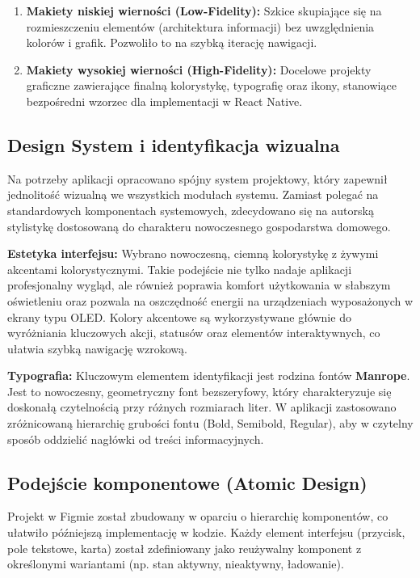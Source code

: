 \begin{enumerate}
    \item \textbf{Makiety niskiej wierności (Low-Fidelity):} Szkice skupiające się na rozmieszczeniu elementów (architektura informacji) bez uwzględnienia kolorów i grafik. Pozwoliło to na szybką iterację nawigacji.
    \item \textbf{Makiety wysokiej wierności (High-Fidelity):} Docelowe projekty graficzne zawierające finalną kolorystykę, typografię oraz ikony, stanowiące bezpośredni wzorzec dla implementacji w React Native.
\end{enumerate}

\subsection{Design System i identyfikacja wizualna}

Na potrzeby aplikacji opracowano spójny system projektowy, który zapewnił jednolitość wizualną we wszystkich modułach systemu. Zamiast polegać na standardowych komponentach systemowych, zdecydowano się na autorską stylistykę dostosowaną do charakteru nowoczesnego gospodarstwa domowego.

\textbf{Estetyka interfejsu:}
Wybrano nowoczesną, ciemną kolorystykę z żywymi akcentami kolorystycznymi. Takie podejście nie tylko nadaje aplikacji profesjonalny wygląd, ale również poprawia komfort użytkowania w słabszym oświetleniu oraz pozwala na oszczędność energii na urządzeniach wyposażonych w ekrany typu OLED. Kolory akcentowe są wykorzystywane głównie do wyróżniania kluczowych akcji, statusów oraz elementów interaktywnych, co ułatwia szybką nawigację wzrokową.

\textbf{Typografia:}
Kluczowym elementem identyfikacji jest rodzina fontów \textbf{Manrope}. Jest to nowoczesny, geometryczny font bezszeryfowy, który charakteryzuje się doskonałą czytelnością przy różnych rozmiarach liter. W aplikacji zastosowano zróżnicowaną hierarchię grubości fontu (Bold, Semibold, Regular), aby w czytelny sposób oddzielić nagłówki od treści informacyjnych.

\subsection{Podejście komponentowe (Atomic Design)}

Projekt w Figmie został zbudowany w oparciu o hierarchię komponentów, co ułatwiło późniejszą implementację w kodzie. Każdy element interfejsu (przycisk, pole tekstowe, karta) został zdefiniowany jako reużywalny komponent z określonymi wariantami (np. stan aktywny, nieaktywny, ładowanie).

